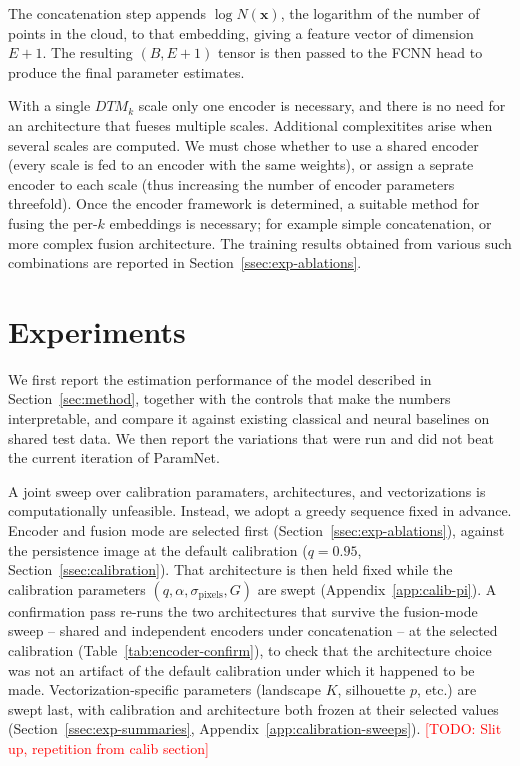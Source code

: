 \documentclass[11pt,letterpaper]{article}
\newcommand{\1}{\mathds{1}}
\newcommand{\pc}{\mathbf{x}}
\newcommand{\todo}[1]{\textcolor{red}{[TODO: #1]}}
\newcommand{\fix}[1]{\textcolor{blue}{[FIX: #1]}}
\newcommand{\todo}[1]{}\newcommand{\fix}[1]{}
\theoremstyle{plain}
\theoremstyle{definitioncolon}
\begin{document}
The concatenation step appends $\log N(\pc)$, the logarithm of the number of points in
the cloud, to that embedding, giving a feature vector of dimension $E + 1$. The
resulting $(B, E + 1)$ tensor is then passed to the FCNN head to produce the
final parameter estimates.

With a single $DTM_k$ scale only one encoder is necessary, and there is no need for 
an architecture that fueses multiple scales. Additional complexitites arise when
several scales are computed. We must chose whether to use a shared encoder
(every scale is fed to an encoder with the same weights), or assign a seprate
encoder to each scale (thus increasing the number of encoder parameters threefold).
Once the encoder framework is determined, a suitable method for fusing the per-$k$
embeddings is necessary; for example simple concatenation, or more complex fusion
architecture. The training results obtained from various such combinations are 
reported in Section~\ref{ssec:exp-ablations}.



\section{Experiments}
\label{sec:experiments}

We first report the estimation performance of the model described in
Section~\ref{sec:method}, together with the controls that make the numbers
interpretable, and compare it against existing classical and neural baselines on shared test
data. We then report the variations that were run and did not beat the current
iteration of ParamNet.

A joint sweep over calibration paramaters, architectures, and vectorizations
is computationally unfeasible. Instead, we adopt a greedy sequence fixed in advance.
Encoder and fusion mode are selected first
(Section~\ref{ssec:exp-ablations}), against the persistence image at the
default calibration ($q=0.95$, Section~\ref{ssec:calibration}). That
architecture is then held fixed while the calibration parameters
$(q,\alpha,\sigma_{\text{pixels}},G)$ are swept (Appendix~\ref{app:calib-pi}).
A confirmation pass re-runs the two architectures that survive the fusion-mode
sweep -- shared and independent encoders under concatenation -- at the
selected calibration (Table~\ref{tab:encoder-confirm}), to check that the
architecture choice was not an artifact of the default calibration under which it
happened to be made. Vectorization-specific parameters (landscape $K$,
silhouette $p$, etc.) are swept last, with calibration and architecture
both frozen at their selected values (Section~\ref{ssec:exp-summaries},
Appendix~\ref{app:calibration-sweeps}). \todo{Slit up, repetition from calib section}
\end{document}
